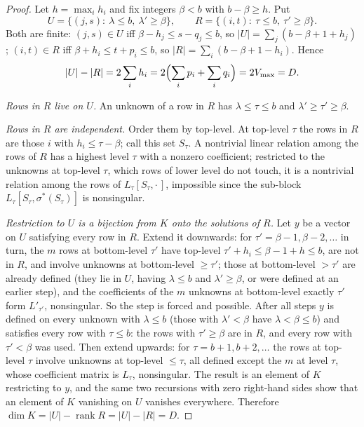 \begin{proof}
Let $h=\max_ih_i$ and fix integers $\beta<b$ with $b-\beta\ge h$. Put
\[
  U=\{(j,s):\ \lambda\le b,\ \lambda'\ge\beta\},\qquad
  R=\{(i,t):\ \tau\le b,\ \tau'\ge\beta\}.
\]
Both are finite: $(j,s)\in U$ iff $\beta-h_j\le s-q_j\le b$, so
$|U|=\sum_j(b-\beta+1+h_j)$; $(i,t)\in R$ iff $\beta+h_i\le t+p_i\le b$, so
$|R|=\sum_i(b-\beta+1-h_i)$. Hence
\[
  |U|-|R|=2\sum_ih_i=2\Bigl(\sum_ip_i+\sum_iq_i\Bigr)=2V_{\max}=D .
\]

\emph{Rows in $R$ live on $U$.} An unknown of a row in $R$ has
$\lambda\le\tau\le b$ and $\lambda'\ge\tau'\ge\beta$.

\emph{Rows in $R$ are independent.} Order them by top-level. At top-level
$\tau$ the rows in $R$ are those $i$ with $h_i\le\tau-\beta$; call this set
$S_\tau$. A nontrivial linear relation among the rows of $R$ has a highest
level $\tau$ with a nonzero coefficient; restricted to the unknowns at
top-level $\tau$, which rows of lower level do not touch, it is a nontrivial
relation among the rows of $L_\tau[S_\tau,\cdot\,]$, impossible since the
sub-block $L_\tau[S_\tau,\sigma^*(S_\tau)]$ is nonsingular.

\emph{Restriction to $U$ is a bijection from $K$ onto the solutions of $R$.}
Let $y$ be a vector on $U$ satisfying every row in $R$. Extend it downwards:
for $\tau'=\beta-1,\beta-2,\dots$ in turn, the $m$ rows at bottom-level $\tau'$
have top-level $\tau'+h_i\le\beta-1+h\le b$, are not in $R$, and involve
unknowns at bottom-level $\ge\tau'$; those at bottom-level $>\tau'$ are already
defined (they lie in $U$, having $\lambda\le b$ and $\lambda'\ge\beta$, or were
defined at an earlier step), and the coefficients of the $m$ unknowns at
bottom-level exactly $\tau'$ form $L'_{\tau'}$, nonsingular. So the step is
forced and possible. After all steps $y$ is defined on every unknown with
$\lambda\le b$ (those with $\lambda'<\beta$ have $\lambda<\beta\le b$) and
satisfies every row with $\tau\le b$: the rows with $\tau'\ge\beta$ are in $R$,
and every row with $\tau'<\beta$ was used. Then extend upwards: for
$\tau=b+1,b+2,\dots$ the rows at top-level $\tau$ involve unknowns at top-level
$\le\tau$, all defined except the $m$ at level $\tau$, whose coefficient matrix
is $L_\tau$, nonsingular. The result is an element of $K$ restricting to $y$,
and the same two recursions with zero right-hand sides show that an element of
$K$ vanishing on $U$ vanishes everywhere. Therefore
$\dim K=|U|-\operatorname{rank}R=|U|-|R|=D$.
\end{proof}

